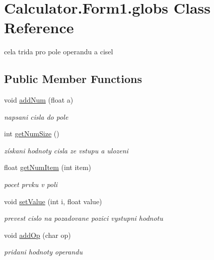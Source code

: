 \hypertarget{class_calculator_1_1_form1_1_1globs}{}\section{Calculator.\+Form1.\+globs Class Reference}
\label{class_calculator_1_1_form1_1_1globs}


cela trida pro pole operandu a cisel  


\subsection*{Public Member Functions}
\begin{DoxyCompactItemize}
\item 
void \hyperlink{class_calculator_1_1_form1_1_1globs_a13fc976548fe1c162cfb142563ea697a}{add\+Num} (float a)
\begin{DoxyCompactList}\small\item\em napsani cisla do pole \end{DoxyCompactList}\item 
int \hyperlink{class_calculator_1_1_form1_1_1globs_abdbbbadfb7bea7c58f47d27e6cda54b2}{get\+Num\+Size} ()
\begin{DoxyCompactList}\small\item\em získani hodnoty cisla ze vstupu a ulozeni \end{DoxyCompactList}\item 
float \hyperlink{class_calculator_1_1_form1_1_1globs_a0479546e140f7cb46832192804e3efe2}{get\+Num\+Item} (int item)
\begin{DoxyCompactList}\small\item\em pocet prvku v poli \end{DoxyCompactList}\item 
void \hyperlink{class_calculator_1_1_form1_1_1globs_a741e3a2ad3a59a57f9ef9bfdbcb9c340}{set\+Value} (int i, float value)
\begin{DoxyCompactList}\small\item\em prevest cislo na pozadovane pozici vystupni hodnotu \end{DoxyCompactList}\item 
void \hyperlink{class_calculator_1_1_form1_1_1globs_a15f497cf643e75497996caf35aef4034}{add\+Op} (char op)
\begin{DoxyCompactList}\small\item\em pridani hodnoty operandu \end{DoxyCompactList}\item 

\end{DoxyCompactItemize}
